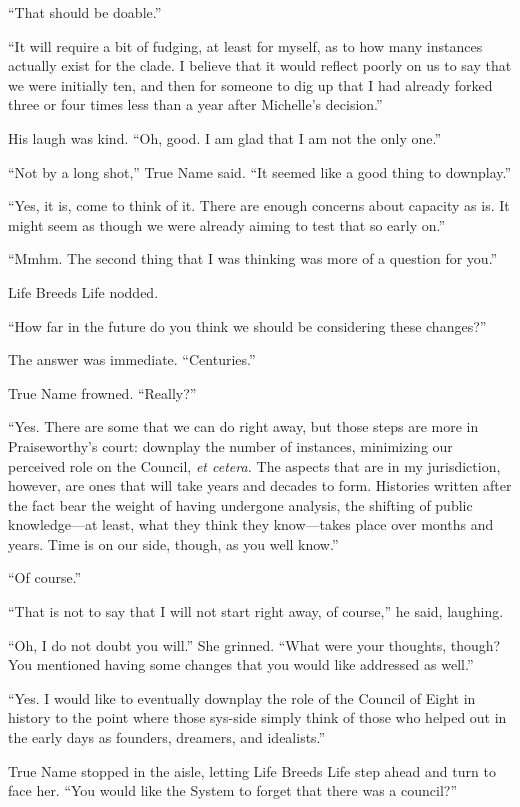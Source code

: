 ``That should be doable.''

``It will require a bit of fudging, at least for myself, as to how many instances actually exist for the clade. I believe that it would reflect poorly on us to say that we were initially ten, and then for someone to dig up that I had already forked three or four times less than a year after Michelle's decision.''

His laugh was kind. ``Oh, good. I am glad that I am not the only one.''

``Not by a long shot,'' True Name said. ``It seemed like a good thing to downplay.''

``Yes, it is, come to think of it. There are enough concerns about capacity as is. It might seem as though we were already aiming to test that so early on.''

``Mmhm. The second thing that I was thinking was more of a question for you.''

Life Breeds Life nodded.

``How far in the future do you think we should be considering these changes?''

The answer was immediate. ``Centuries.''

True Name frowned. ``Really?''

``Yes. There are some that we can do right away, but those steps are more in Praiseworthy's court: downplay the number of instances, minimizing our perceived role on the Council, \emph{et cetera.} The aspects that are in my jurisdiction, however, are ones that will take years and decades to form. Histories written after the fact bear the weight of having undergone analysis, the shifting of public knowledge---at least, what they think they know---takes place over months and years. Time is on our side, though, as you well know.''

``Of course.''

``That is not to say that I will not start right away, of course,'' he said, laughing.

``Oh, I do not doubt you will.'' She grinned. ``What were your thoughts, though? You mentioned having some changes that you would like addressed as well.''

``Yes. I would like to eventually downplay the role of the Council of Eight in history to the point where those sys-side simply think of those who helped out in the early days as founders, dreamers, and idealists.''

True Name stopped in the aisle, letting Life Breeds Life step ahead and turn to face her. ``You would like the System to forget that there was a council?''

